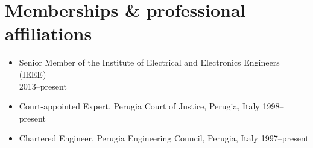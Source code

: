 \documentclass[11pt]{article}
\begin{document}
\section*{Memberships \& professional affiliations}

\begin{itemize}
	\item Senior Member of the Institute of Electrical and Electronics Engineers (IEEE) \\ \mbox{} \hfill 2013--present
	\item Court-appointed Expert, Perugia Court of Justice, Perugia, Italy \hfill 1998--present
	\item Chartered Engineer, Perugia Engineering Council, Perugia, Italy \hfill 1997--present
\end{itemize}



 
\end{document}
